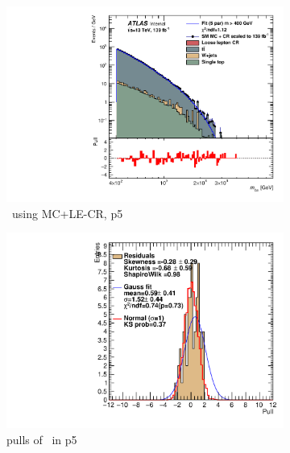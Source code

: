\begin{figure}[H]
\begin{subfigure}[h]{0.38\linewidth}
    \includegraphics[scale=0.3]{figs/ch6/fit/variable_nosmooth/p5/10PB/output_SMMCplusCR_Mbm_p5.pdf}%
     \caption{\mbmu \ using MC+LE-CR, p5}
     \end{subfigure}
     \hfill
    \begin{subfigure}[h]{0.4\linewidth}
    \includegraphics[scale=0.32]{figs/ch6/fit/variable_nosmooth/p5/10PB/pull_SMMCplusCR_Mbm_p5.pdf}%
    \caption{pulls of \mbmu \ in p5}
    \end{subfigure}
    \hfill
    \begin{subfigure}[h]{0.38\linewidth}

\end{subfigure}
\end{figure}
